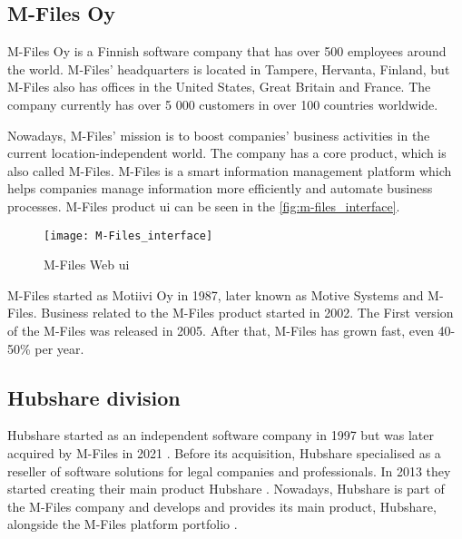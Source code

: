\subsection{M-Files Oy}
M-Files Oy is a Finnish software company that has over 500 employees around the world. M-Files' headquarters is located in Tampere, Hervanta, Finland, but M-Files also has offices in the United States, Great Britain and France. The company currently has over 5 000 customers in over 100 countries worldwide. \cite{mfiles2022tutustu}

Nowadays, M-Files' mission is to boost companies' business activities in the current location-independent world. The company has a core product, which is also called M-Files. M-Files is a smart information management platform which helps companies manage information more efficiently and automate business processes. M-Files product \gls{ui} can be seen in the \autoref{fig:m-files_interface}. \cite{mfiles2022tutustu}
\begin{figure}
	\centering
	\texttt{[image: M-Files\_interface]}
	\caption{M-Files Web \gls{ui}}
	\label{fig:m-files_interface}
\end{figure}

M-Files started as Motiivi Oy in 1987, later known as Motive Systems and M-Files. Business related to the M-Files product started in 2002. The First version of the M-Files was released in 2005. After that, M-Files has grown fast, even 40-50\% per year. \cite{mansikkamäki2017tamperelainen, pääomasijoittajat2022mfiles}
\FloatBarrier

\subsection{Hubshare division}\label{section:hubshare_division}
Hubshare started as an independent software company in 1997 but was later acquired by M-Files in 2021 \cite{hubshare2020, dekelbaum2021mfiles}. Before its acquisition, Hubshare specialised as a reseller of software solutions for legal companies and professionals. In 2013 they started creating their main product Hubshare \cite{hubshare2020}. Nowadays, Hubshare is part of the M-Files company and develops and provides its main product, Hubshare, alongside the M-Files platform portfolio \cite{dekelbaum2021mfiles}.

